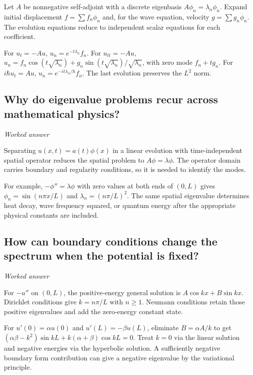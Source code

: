\documentclass[11pt]{article}
\begin{document}
Let \(A\) be nonnegative self-adjoint with a discrete eigenbasis \(A\phi_n=\lambda_n\phi_n\). Expand initial displacement \(f=\sum f_n\phi_n\) and, for the wave equation, velocity \(g=\sum g_n\phi_n\). The evolution equations reduce to independent scalar equations for each coefficient.

For \(u_t=-Au\), \(u_n=e^{-t\lambda_n}f_n\). For \(u_{tt}=-Au\), \(u_n=f_n\cos(t\sqrt{\lambda_n})+g_n\sin(t\sqrt{\lambda_n})/\sqrt{\lambda_n}\), with zero mode \(f_n+tg_n\). For \(i\hbar u_t=Au\), \(u_n=e^{-it\lambda_n/\hbar}f_n\). The last evolution preserves the \(L^2\) norm.

\subsection{Why do eigenvalue problems recur across mathematical physics?}
\label{problem:eigenvalue-motivation}
\textit{Worked answer}

Separating \(u(x,t)=a(t)\phi(x)\) in a linear evolution with time-independent spatial operator reduces the spatial problem to \(A\phi=\lambda\phi\). The operator domain carries boundary and regularity conditions, so it is needed to identify the modes.

For example, \(-\phi''=\lambda\phi\) with zero values at both ends of \((0,L)\) gives \(\phi_n=\sin(n\pi x/L)\) and \(\lambda_n=(n\pi/L)^2\). The same spatial eigenvalue determines heat decay, wave frequency squared, or quantum energy after the appropriate physical constants are included.

\subsection{How can boundary conditions change the spectrum when the potential is fixed?}
\label{problem:boundary-spectrum}
\textit{Worked answer}

For \(-u''\) on \((0,L)\), the positive-energy general solution is \(A\cos kx+B\sin kx\). Dirichlet conditions give \(k=n\pi/L\) with \(n\ge1\). Neumann conditions retain those positive eigenvalues and add the zero-energy constant state.

For \(u'(0)=\alpha u(0)\) and \(u'(L)=-\beta u(L)\), eliminate \(B=\alpha A/k\) to get \((\alpha\beta-k^2)\sin kL+k(\alpha+\beta)\cos kL=0\). Treat \(k=0\) via the linear solution and negative energies via the hyperbolic solution. A sufficiently negative boundary form contribution can give a negative eigenvalue by the variational principle.
\end{document}
